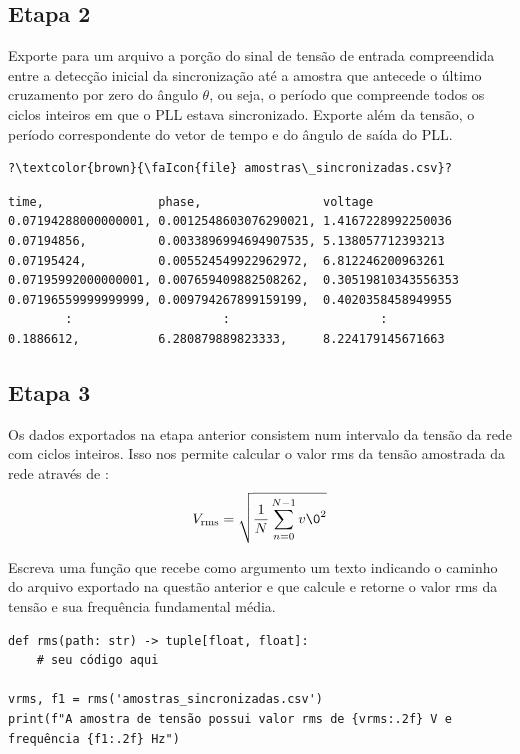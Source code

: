 \subsection*{Etapa 2}
Exporte para um arquivo  a porção do sinal de tensão de entrada compreendida entre a detecção
inicial da sincronização até a amostra que antecede o último cruzamento por zero do ângulo $\theta$, ou seja, o período
que compreende todos os ciclos inteiros em que o PLL estava sincronizado.
Exporte além da tensão, o período correspondente do vetor de tempo e do ângulo de saída do PLL.

\pagebreak

\begin{verbatim}
?\textcolor{brown}{\faIcon{file} amostras\_sincronizadas.csv}?
\end{verbatim}
\vspace{-0.8em}
\begin{verbatim}
time,                phase,                 voltage
0.07194288000000001, 0.0012548603076290021, 1.4167228992250036
0.07194856,          0.0033896994694907535, 5.138057712393213
0.07195424,          0.005524549922962972,  6.812246200963261
0.07195992000000001, 0.007659409882508262,  0.30519810343556353
0.07196559999999999, 0.009794267899159199,  0.4020358458949955
        :                     :                     :
0.1886612,           6.280879889823333,     8.224179145671663
\end{verbatim}


\subsection*{Etapa 3}
Os dados exportados na etapa anterior consistem num intervalo da tensão da rede com ciclos inteiros.
Isso nos permite calcular o valor rms da tensão amostrada da rede através de :
\begin{equation}\label{eq:rms}
V_{\text{rms}} = \sqrt{\dfrac{1}{N} \sum_ {n=0} ^{N-1} v\0 ^2}
\end{equation}

Escreva uma função   que recebe como argumento um texto indicando o caminho
do arquivo exportado na questão anterior e que calcule e retorne o valor rms da tensão e sua frequência fundamental média.
\begin{verbatim}
def rms(path: str) -> tuple[float, float]:
    # seu código aqui

vrms, f1 = rms('amostras_sincronizadas.csv')
print(f"A amostra de tensão possui valor rms de {vrms:.2f} V e frequência {f1:.2f} Hz")
\end{verbatim}

